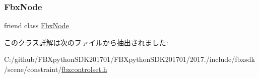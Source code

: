 \subsubsection{\texorpdfstring{Fbx\+Node}{FbxNode}}
{\footnotesize\ttfamily friend class \hyperlink{class_fbx_node}{Fbx\+Node}\hspace{0.3cm}{\ttfamily [friend]}}



このクラス詳解は次のファイルから抽出されました\+:\begin{DoxyCompactItemize}
\item 
C\+:/github/\+F\+B\+Xpython\+S\+D\+K201701/\+F\+B\+Xpython\+S\+D\+K201701/2017./include/fbxsdk/scene/constraint/\hyperlink{fbxcontrolset_8h}{fbxcontrolset.\+h}\end{DoxyCompactItemize}
